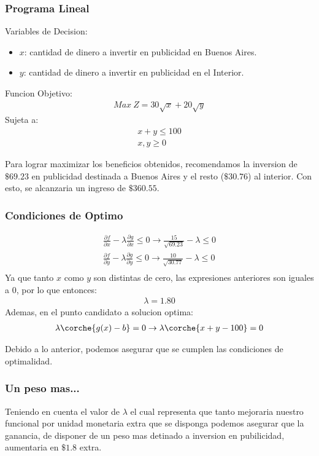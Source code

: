 \begin{homeworkProblem}[-1][Quilmes]

\subsubsection{Programa Lineal}
Variables de Decision:
\begin{itemize}
    \item $x$: cantidad de dinero a invertir en publicidad en Buenos Aires.
    \item $y$: cantidad de dinero a invertir en publicidad en el Interior.
\end{itemize}
Funcion Objetivo:
\begin{align*}
    Max\ Z = 30\sqrt{x} + 20\sqrt{y}
\end{align*}
Sujeta a:
\begin{align*}
    x+y\leq 100 \\ x,y\geq0
\end{align*}

Para lograr maximizar los beneficios obtenidos, recomendamos la inversion de $\$69.23$ en publicidad destinada a Buenos Aires y el resto ($\$30.76$) al interior. Con esto, se alcanzaria un ingreso de $\$360.55$.

\subsubsection{Condiciones de Optimo}

\begin{align*}
    \frac{\partial f}{\partial x} - \lambda \frac{\partial g}{\partial x} \leq 0 \rightarrow \frac{15}{\sqrt{69.23}} - \lambda \leq 0 \\
    \frac{\partial f}{\partial y} - \lambda \frac{\partial g}{\partial y} \leq 0 \rightarrow \frac{10}{\sqrt{30.77}} - \lambda \leq 0 \\
\end{align*}
Ya que tanto $x$ como $y$ son distintas de cero, las expresiones anteriores son iguales a $0$, por lo que entonces:
\begin{align*}
    \lambda = 1.80
\end{align*}
Ademas, en el punto candidato a solucion optima:
\begin{align*}
    \lambda\corche{g(x)-b} = 0 \rightarrow \lambda\corche{x+y-100} = 0
\end{align*}

Debido a lo anterior, podemos asegurar que se cumplen las condiciones de optimalidad.



\subsubsection{Un peso mas...}
Teniendo en cuenta el valor de $\lambda$ el cual representa que tanto mejoraria nuestro funcional por unidad monetaria extra que se disponga
podemos asegurar que la ganancia, de disponer de un peso mas detinado a inversion en pubilicidad, aumentaria en $\$1.8$ extra.
\end{homeworkProblem}